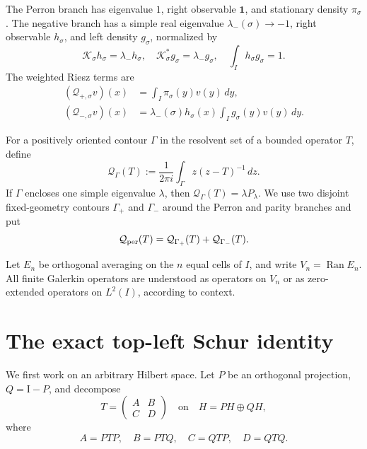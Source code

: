 \documentclass[11pt]{article}
\theoremstyle{definition}
\theoremstyle{remark}
\newcommand{\C}{\mathbb C}
\newcommand{\Id}{\mathrm I}
\newcommand{\cK}{\mathcal K}
\newcommand{\cQ}{\mathcal Q}
\begin{document}
The Perron branch has eigenvalue $1$, right observable $\mathbf1$, and
stationary density $\pi_\sigma$.  The negative branch has a simple real
eigenvalue $\lambda_-(\sigma)\to-1$, right observable $h_\sigma$, and left
density $g_\sigma$, normalized by
\begin{equation}
 \cK_\sigma h_\sigma=\lambda_-h_\sigma,
 \quad
 \cK_\sigma^*g_\sigma=\lambda_-g_\sigma,
 \quad
 \int_Ih_\sigma g_\sigma=1.
 \label{eq:parity-factors}
\end{equation}
The weighted Riesz terms are
\begin{align}
 (\cQ_{+,\sigma}v)(x)
 &=\int_I\pi_\sigma(y)v(y)\,dy,
 \label{eq:perron-term}\\
 (\cQ_{-,\sigma}v)(x)
 &=\lambda_-(\sigma)h_\sigma(x)
   \int_Ig_\sigma(y)v(y)\,dy.
 \label{eq:parity-term}
\end{align}

For a positively oriented contour $\Gamma$ in the resolvent set of a
bounded operator $T$, define
\begin{equation}
 \cQ_\Gamma(T)
 :=\frac1{2\pi i}\int_\Gamma z(z-T)^{-1}\,dz.
 \label{eq:weighted-riesz}
\end{equation}
If $\Gamma$ encloses one simple eigenvalue $\lambda$, then
$\cQ_\Gamma(T)=\lambda P_\lambda$.  We use two disjoint fixed-geometry
contours $\Gamma_+$ and $\Gamma_-$ around the Perron and parity branches and
put
\begin{equation}
 \cQ_{\rm per}(T)
 =\cQ_{\Gamma_+}(T)+\cQ_{\Gamma_-}(T).
 \label{eq:peripheral-functional}
\end{equation}

Let $E_n$ be orthogonal averaging on the $n$ equal cells of $I$, and write
$V_n=\operatorname{Ran}E_n$.  All finite Galerkin operators are understood
as operators on $V_n$ or as zero-extended operators on $L^2(I)$, according
to context.

\section{The exact top-left Schur identity}
\label{sec:schur}

We first work on an arbitrary Hilbert space.  Let $P$ be an orthogonal
projection, $Q=\Id-P$, and decompose
\begin{equation}
 T=\begin{pmatrix}A&B\\C&D\end{pmatrix}
 \quad\text{on}\quad
 H=PH\oplus QH,
 \label{eq:block-T}
\end{equation}
where
\begin{equation}
 A=PTP,
 \quad B=PTQ,
 \quad C=QTP,
 \quad D=QTQ.
 \label{eq:block-definitions}
\end{equation}
\end{document}
